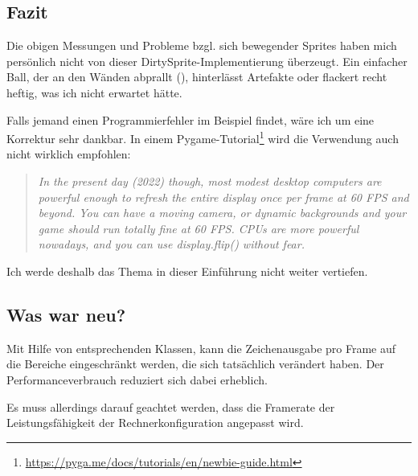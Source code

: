 \subsection{Fazit}

Die obigen Messungen und Probleme bzgl. sich bewegender Sprites haben mich persönlich nicht von dieser DirtySprite-Implementierung überzeugt. Ein einfacher Ball, der an den Wänden abprallt (), hinterlässt Artefakte oder flackert recht heftig, was ich nicht erwartet hätte.  


Falls jemand einen Programmierfehler im Beispiel findet, wäre ich um eine Korrektur sehr dankbar. In einem Pygame-Tutorial\footnote{\url{https://pyga.me/docs/tutorials/en/newbie-guide.html}} wird die Verwendung auch nicht wirklich empfohlen:

\begin{quote}
\textit{In the present day (2022) though, most modest desktop computers are powerful enough to refresh the entire display once per frame at 60 FPS and beyond. You can have a moving camera, or dynamic backgrounds and your game should run totally fine at 60 FPS. CPUs are more powerful nowadays, and you can use display.flip() without fear.}
\end{quote}

Ich werde deshalb das Thema in dieser Einführung nicht weiter vertiefen.

\subsection*{Was war neu?}

Mit Hilfe von entsprechenden Klassen, kann die Zeichenausgabe pro Frame auf die Bereiche eingeschränkt werden, die sich tatsächlich verändert haben. Der Performanceverbrauch reduziert sich dabei erheblich. 

Es muss allerdings darauf geachtet werden, dass die Framerate der Leistungsfähigkeit der Rechnerkonfiguration angepasst wird. 

